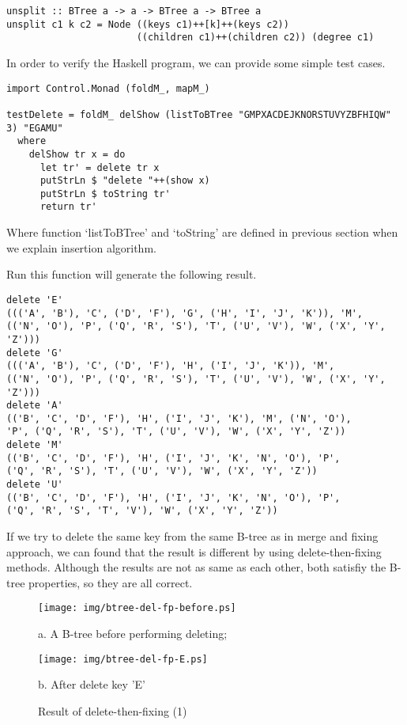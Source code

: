 \documentclass{article}
\begin{document}
\begin{lstlisting}
unsplit :: BTree a -> a -> BTree a -> BTree a
unsplit c1 k c2 = Node ((keys c1)++[k]++(keys c2))
                       ((children c1)++(children c2)) (degree c1)
\end{lstlisting}

In order to verify the Haskell program, we can provide some simple
test cases.

\begin{lstlisting}
import Control.Monad (foldM_, mapM_)

testDelete = foldM_ delShow (listToBTree "GMPXACDEJKNORSTUVYZBFHIQW" 3) "EGAMU" 
  where
    delShow tr x = do
      let tr' = delete tr x
      putStrLn $ "delete "++(show x)
      putStrLn $ toString tr'
      return tr'
\end{lstlisting}

Where function `listToBTree' and `toString' are defined in previous section when we
explain insertion algorithm.

Run this function will generate the following result.

\begin{verbatim}
delete 'E'
((('A', 'B'), 'C', ('D', 'F'), 'G', ('H', 'I', 'J', 'K')), 'M', 
(('N', 'O'), 'P', ('Q', 'R', 'S'), 'T', ('U', 'V'), 'W', ('X', 'Y', 'Z')))
delete 'G'
((('A', 'B'), 'C', ('D', 'F'), 'H', ('I', 'J', 'K')), 'M', 
(('N', 'O'), 'P', ('Q', 'R', 'S'), 'T', ('U', 'V'), 'W', ('X', 'Y', 'Z')))
delete 'A'
(('B', 'C', 'D', 'F'), 'H', ('I', 'J', 'K'), 'M', ('N', 'O'), 
'P', ('Q', 'R', 'S'), 'T', ('U', 'V'), 'W', ('X', 'Y', 'Z'))
delete 'M'
(('B', 'C', 'D', 'F'), 'H', ('I', 'J', 'K', 'N', 'O'), 'P', 
('Q', 'R', 'S'), 'T', ('U', 'V'), 'W', ('X', 'Y', 'Z'))
delete 'U'
(('B', 'C', 'D', 'F'), 'H', ('I', 'J', 'K', 'N', 'O'), 'P', 
('Q', 'R', 'S', 'T', 'V'), 'W', ('X', 'Y', 'Z'))
\end{verbatim}

If we try to delete the same key from the same B-tree as in merge and fixing
approach, we can found that the result is different by using delete-then-fixing
methods. Although the results are not as same as each other, both satisfiy
the B-tree properties, so they are all correct.

\begin{figure}[htbp]
    \begin{center}
      \texttt{[image: img/btree-del-fp-before.ps]}

      a. A B-tree before performing deleting;

      \texttt{[image: img/btree-del-fp-E.ps]}

      b. After delete key 'E'
      \caption{Result of delete-then-fixing (1)} \label{fig:result-del-fp1}
    \end{center}
\end{figure}
\end{document}
